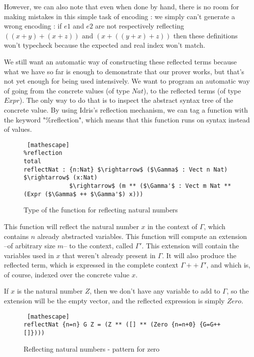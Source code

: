 However, we can also note that even when done by hand, there is no room for making mistakes in this simple task of encoding : we simply can't generate a wrong encoding : if $e1$ and $e2$ are not respectively reflecting $((x+y) + (x+z))$ and $(x + ((y + x) + z))$ then these definitions won't typecheck because the expected and real index won't match.

We still want an automatic way of constructing these reflected terms because what we have so far is enough to demonstrate that our prover works, but that's not yet enough for being used intensively. We want to program an automatic way of going from the concrete values (of type $Nat$), to the reflected terms (of type $Expr$). The only way to do that is to inspect the abstract syntax tree of the concrete value.
By using Idris's reflection mechanism, we can tag a function with the keyword "\%reflection", which means that this function runs on syntax instead of values. 

\begin{figure}[H]
\figrule
\begin{center}
\begin{lstlisting} [mathescape]
%reflection
total
reflectNat : {n:Nat} $\rightarrow$ ($\Gamma$ : Vect n Nat) $\rightarrow$ (x:Nat) 
             $\rightarrow$ (m ** ($\Gamma'$ : Vect m Nat ** (Expr ($\Gamma$ ++ $\Gamma'$) x)))
\end{lstlisting}
\end{center}
\caption{Type of the function for reflecting natural numbers}
\label{reflectNatType}
\figrule
\end{figure}

This function will reflect the natural number $x$ in the context of $\Gamma$, which contains $n$ already abstracted variables. This function will compute an extension --of arbitrary size $m$-- to the context, called $\Gamma'$. This extension will contain the variables used in $x$ that weren't already present in $\Gamma$. It will also produce the reflected term, which is expressed in the complete context $\Gamma ++\ \Gamma'$, and which is, of course, indexed over the concrete value $x$.

If $x$ is the natural number $Z$, then we don't have any variable to add to $\Gamma$, so the extension will be the empty vector, and the reflected expression is simply $Zero$.

 \begin{figure}[H]
\figrule
\begin{center}
\begin{lstlisting} [mathescape]
reflectNat {n=n} G Z = (Z ** ([] ** (Zero {n=n+0} {G=G++[]})))
\end{lstlisting}
\end{center}
\caption{Reflecting natural numbers - pattern for zero}
\label{reflectNat_pattern1}
\figrule
\end{figure}


